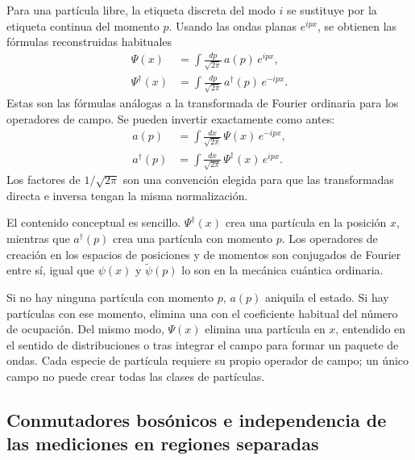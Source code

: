Para una partícula libre, la etiqueta discreta del modo \(i\) se sustituye por la etiqueta continua del momento \(p\). Usando las ondas planas \(e^{ipx}\), se obtienen las fórmulas reconstruidas habituales
\begin{align}
\Psi(x) &= \int \frac{dp}{\sqrt{2\pi}}\,a(p)\,e^{ipx},\\
\Psi^\dagger(x) &= \int \frac{dp}{\sqrt{2\pi}}\,a^\dagger(p)\,e^{-ipx}.
\end{align}
Estas son las fórmulas análogas a la transformada de Fourier ordinaria para los operadores de campo. Se pueden invertir exactamente como antes:
\begin{align}
a(p) &= \int \frac{dx}{\sqrt{2\pi}}\,\Psi(x)\,e^{-ipx},\\
a^\dagger(p) &= \int \frac{dx}{\sqrt{2\pi}}\,\Psi^\dagger(x)\,e^{ipx}.
\end{align}
Los factores de \(1/\sqrt{2\pi}\) son una convención elegida para que las transformadas directa e inversa tengan la misma normalización.

El contenido conceptual es sencillo. \(\Psi^\dagger(x)\) crea una partícula en la posición \(x\), mientras que \(a^\dagger(p)\) crea una partícula con momento \(p\). Los operadores de creación en los espacios de posiciones y de momentos son conjugados de Fourier entre sí, igual que \(\psi(x)\) y \(\tilde{\psi}(p)\) lo son en la mecánica cuántica ordinaria.

Si no hay ninguna partícula con momento \(p\), \(a(p)\) aniquila el estado. Si hay partículas con ese momento, elimina una con el coeficiente habitual del número de ocupación. Del mismo modo, \(\Psi(x)\) elimina una partícula en \(x\), entendido en el sentido de distribuciones o tras integrar el campo para formar un paquete de ondas. Cada especie de partícula requiere su propio operador de campo; un único campo no puede crear todas las clases de partículas.

\subsection{Conmutadores bosónicos e independencia de las mediciones en regiones separadas}

